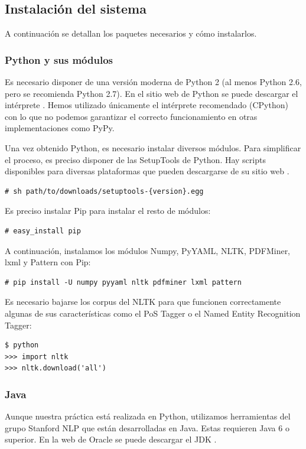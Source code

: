 \documentclass[12pt,a4paper,titlepage]{article}
\begin{document}
\subsection{Instalación del sistema}
A continuación se detallan los paquetes necesarios y cómo instalarlos.

\subsubsection{Python y sus módulos}
Es necesario disponer de una versión moderna de Python 2 (al menos Python 2.6, pero se recomienda Python 2.7). En el sitio web de Python se puede descargar el intérprete \cite{python}. Hemos utilizado únicamente el intérprete recomendado (CPython) con lo que no podemos garantizar el correcto funcionamiento en otras implementaciones como PyPy.

Una vez obtenido Python, es necesario instalar diversos módulos. Para simplificar el proceso, es preciso disponer de las SetupTools de Python. Hay scripts disponibles para diversas plataformas que pueden descargarse de su sitio web \cite{setuptools}.

\begin{lstlisting}
# sh path/to/downloads/setuptools-{version}.egg
\end{lstlisting}

Es preciso instalar Pip para instalar el resto de módulos:

\begin{lstlisting}
# easy_install pip
\end{lstlisting}

A continuación, instalamos los módulos Numpy, PyYAML, NLTK, PDFMiner, lxml y Pattern con Pip:

\begin{lstlisting}
# pip install -U numpy pyyaml nltk pdfminer lxml pattern
\end{lstlisting}

Es necesario bajarse los corpus del NLTK para que funcionen correctamente algunas de sus características como el PoS Tagger o el Named Entity Recognition Tagger:

\begin{lstlisting}
$ python
>>> import nltk
>>> nltk.download('all')
\end{lstlisting}


\subsubsection{Java}
Aunque nuestra práctica está realizada en Python, utilizamos herramientas del grupo Stanford NLP que están desarrolladas en Java. Estas requieren Java 6 o superior. En la web de Oracle se puede descargar el JDK \cite{java}.
\end{document}
